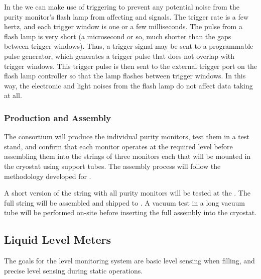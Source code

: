 In the  we can make use of triggering to prevent any potential noise from the purity monitor's flash lamp from affecting  and  signals. The  trigger rate is a few hertz, and each trigger window is one or a few milliseconds. %
The pulse from a flash lamp is very short (a microsecond or so, much shorter than the gaps between  trigger windows). 
Thus, a  trigger signal may be sent to a programmable pulse generator, %
which generates a trigger pulse that does not overlap with  trigger windows. This trigger pulse %
is then sent to the external trigger port on the flash lamp  controller so that the lamp flashes between  trigger windows. In this way, the electronic and light noises from the flash lamp do %
not affect %
data taking at all.



\subsubsection{Production and Assembly}
\label{sec:PrMon-Production-Assembly}

The  consortium will produce the individual purity monitors, test them in a test stand, and confirm that each monitor operates at the required level before assembling them into the strings of three monitors each that will be mounted in the  cryostat using support tubes. The assembly process will follow the methodology developed for .



A short version of the %
string
with all purity monitors will be tested at the .
The full string will be assembled and shipped to . 
 A vacuum test in a long vacuum tube will be performed on-site before inserting the full assembly into the  cryostat. 



\subsection{Liquid Level Meters}

The goals for the  level monitoring system are basic level sensing when filling, and precise level sensing during static operations. 

